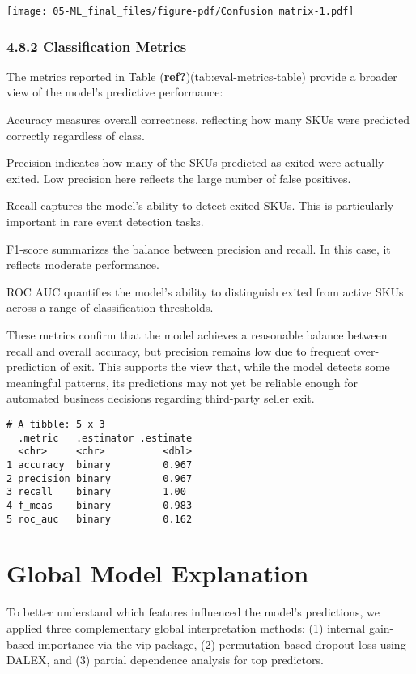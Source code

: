 \documentclass[
  letterpaper,
  DIV=11,
  numbers=noendperiod]{scrartcl}
\begin{document}
\texttt{[image: 05-ML\_final\_files/figure-pdf/Confusion matrix-1.pdf]}

\subsubsection{4.8.2 Classification
Metrics}\label{classification-metrics}

The metrics reported in Table (\textbf{ref?})(tab:eval-metrics-table)
provide a broader view of the model's predictive performance:

Accuracy measures overall correctness, reflecting how many SKUs were
predicted correctly regardless of class.

Precision indicates how many of the SKUs predicted as exited were
actually exited. Low precision here reflects the large number of false
positives.

Recall captures the model's ability to detect exited SKUs. This is
particularly important in rare event detection tasks.

F1-score summarizes the balance between precision and recall. In this
case, it reflects moderate performance.

ROC AUC quantifies the model's ability to distinguish exited from active
SKUs across a range of classification thresholds.

These metrics confirm that the model achieves a reasonable balance
between recall and overall accuracy, but precision remains low due to
frequent over-prediction of exit. This supports the view that, while the
model detects some meaningful patterns, its predictions may not yet be
reliable enough for automated business decisions regarding third-party
seller exit.

\begin{verbatim}
# A tibble: 5 x 3
  .metric   .estimator .estimate
  <chr>     <chr>          <dbl>
1 accuracy  binary         0.967
2 precision binary         0.967
3 recall    binary         1.00 
4 f_meas    binary         0.983
5 roc_auc   binary         0.162
\end{verbatim}

\section{Global Model Explanation}\label{global-model-explanation}

To better understand which features influenced the model's predictions,
we applied three complementary global interpretation methods: (1)
internal gain-based importance via the vip package, (2)
permutation-based dropout loss using DALEX, and (3) partial dependence
analysis for top predictors.
\end{document}
